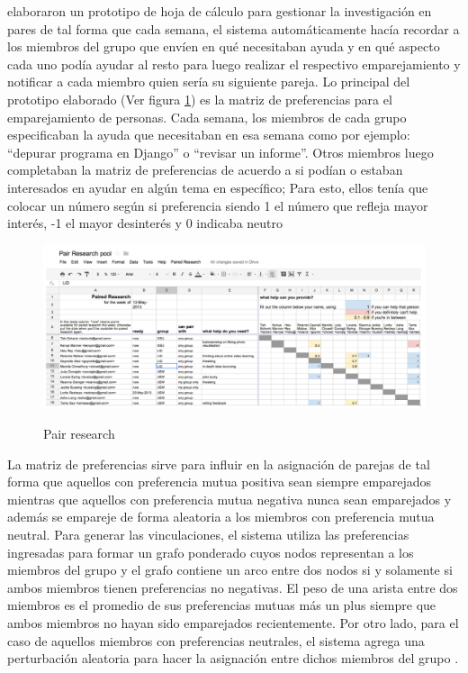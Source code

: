  elaboraron un prototipo de hoja de cálculo para gestionar la investigación en pares de tal forma que cada semana, el sistema automáticamente hacía recordar a los miembros del grupo que envíen en qué necesitaban ayuda y en qué aspecto cada uno podía ayudar al resto para luego realizar el respectivo emparejamiento y notificar a cada miembro quien sería su siguiente pareja. Lo principal del prototipo elaborado (Ver figura \ref{fig:pair_research}) es la matriz de preferencias para el emparejamiento de personas. Cada semana, los miembros de cada grupo especificaban la ayuda que necesitaban en esa semana como por ejemplo: ``depurar programa en Django'' o ``revisar un informe''. Otros miembros luego completaban la matriz de preferencias de acuerdo a si podían o estaban interesados en ayudar en algún tema en específico; Para esto, ellos tenía que colocar un número según si preferencia siendo 1 el número que refleja mayor interés, -1 el mayor desinterés y 0 indicaba neutro \cite{miller_pair_2014} \\

\begin{figure}[h]
  \centering
  \includegraphics[scale=0.4]{figuras/pair_research.png}\\
  \caption[Pair Research]{Pair research \protect\cite{miller_pair_2014}}
  \label{fig:pair_research}
\end{figure}

La matriz de preferencias sirve para influir en la asignación de parejas de tal forma que aquellos con preferencia mutua positiva sean siempre emparejados mientras que aquellos con preferencia mutua negativa nunca sean emparejados y además se empareje de forma aleatoria a los miembros con preferencia mutua neutral. Para generar las vinculaciones, el sistema utiliza las preferencias ingresadas para formar un grafo ponderado cuyos nodos representan a los miembros del grupo y el grafo contiene un arco entre dos nodos si y solamente si ambos miembros tienen preferencias no negativas. El peso de una arista entre dos miembros es el promedio de sus preferencias mutuas más un plus siempre que ambos miembros no hayan sido emparejados recientemente. Por otro lado, para el caso de aquellos miembros con preferencias neutrales, el sistema agrega una perturbación aleatoria para hacer la asignación entre dichos miembros del grupo \cite{miller_pair_2014}.\\

